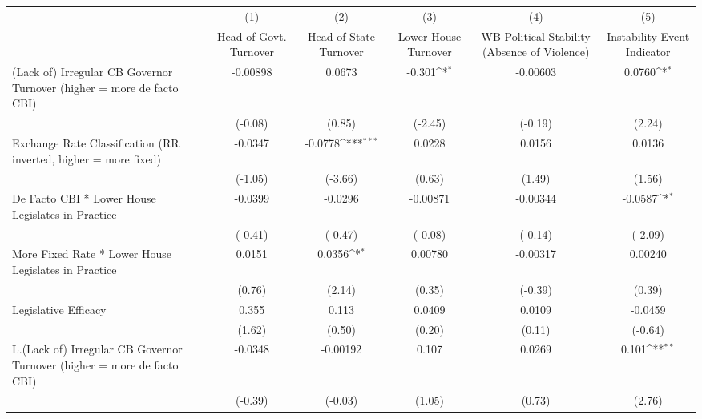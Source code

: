 {
\def\sym#1{\ifmmode^{#1}\else\(^{#1}\)\fi}
\begin{tabular}{l*{5}{c}}
\hline\hline
                &\multicolumn{1}{c}{(1)}&\multicolumn{1}{c}{(2)}&\multicolumn{1}{c}{(3)}&\multicolumn{1}{c}{(4)}&\multicolumn{1}{c}{(5)}\\
                &\multicolumn{1}{c}{Head of Govt. Turnover}&\multicolumn{1}{c}{Head of State Turnover}&\multicolumn{1}{c}{Lower House Turnover}&\multicolumn{1}{c}{WB Political Stability (Absence of Violence)}&\multicolumn{1}{c}{Instability Event Indicator}\\
\hline
(Lack of) Irregular CB Governor Turnover (higher = more de facto CBI)& -0.00898         &   0.0673         &   -0.301\sym{*}  & -0.00603         &   0.0760\sym{*}  \\
                &  (-0.08)         &   (0.85)         &  (-2.45)         &  (-0.19)         &   (2.24)         \\
[1em]
Exchange Rate Classification (RR inverted, higher = more fixed)&  -0.0347         &  -0.0778\sym{***}&   0.0228         &   0.0156         &   0.0136         \\
                &  (-1.05)         &  (-3.66)         &   (0.63)         &   (1.49)         &   (1.56)         \\
[1em]
De Facto CBI * Lower House Legislates in Practice&  -0.0399         &  -0.0296         & -0.00871         & -0.00344         &  -0.0587\sym{*}  \\
                &  (-0.41)         &  (-0.47)         &  (-0.08)         &  (-0.14)         &  (-2.09)         \\
[1em]
More Fixed Rate * Lower House Legislates in Practice&   0.0151         &   0.0356\sym{*}  &  0.00780         & -0.00317         &  0.00240         \\
                &   (0.76)         &   (2.14)         &   (0.35)         &  (-0.39)         &   (0.39)         \\
[1em]
Legislative Efficacy&    0.355         &    0.113         &   0.0409         &   0.0109         &  -0.0459         \\
                &   (1.62)         &   (0.50)         &   (0.20)         &   (0.11)         &  (-0.64)         \\
[1em]
L.(Lack of) Irregular CB Governor Turnover (higher = more de facto CBI)&  -0.0348         & -0.00192         &    0.107         &   0.0269         &    0.101\sym{**} \\
                &  (-0.39)         &  (-0.03)         &   (1.05)         &   (0.73)         &   (2.76)         \\

\end{tabular}}
